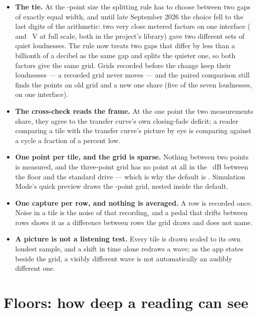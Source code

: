 \documentclass[11pt,a4paper]{article}
\begin{document}
\begin{itemize}
  per rig state, and the picture keeps the pedal's own shift precisely
  because it is not lined up.
  \item \textbf{The tie.} At the \wmTieDimension{}-point size the
  splitting rule has to choose between two gaps of exactly equal width,
  and until late September 2026 the choice fell to the last digits of the
  arithmetic: two very close metered factors on one interface
  (\wmTieFactorA{} and \wmTieFactorB{}~V at full scale, both in the
  project's library) gave two different sets of quiet loudnesses. The
  rule now treats two gaps that differ by less than a billionth of a
  decibel as the same gap and splits the quieter one, so both factors
  give the same grid. Grids recorded before the change keep their
  loudnesses --- a recorded grid never moves --- and the paired
  comparison still finds the points an old grid and a new one share
  (five of the seven loudnesses, on one interface).
  \item \textbf{The cross-check reads the frame.} At the one point the
  two measurements share, they agree to the transfer curve's own
  closing-fade deficit; a reader comparing a tile with the transfer
  curve's picture by eye is comparing against a cycle a fraction of a
  percent low.
  \item \textbf{One point per tile, and the grid is sparse.} Nothing
  between two points is measured, and the three-point grid has no point
  at all in the \wmFloorSpanDB{}~dB between the floor and the standard
  drive --- which is why the default is \wmDefaultDimension{}. Simulation
  Mode's quick preview draws the \wmSimInteractiveDimension{}-point grid,
  nested inside the default.
  \item \textbf{One capture per row, and nothing is averaged.} A row is
  recorded once. Noise in a tile is the noise of that recording, and a
  pedal that drifts between rows shows it as a difference between rows the
  grid draws and does not name.
  \item \textbf{A picture is not a listening test.} Every tile is drawn
  scaled to its own loudest sample, and a shift in time alone redraws a
  wave; as the app states beside the grid, a visibly different wave is not automatically an audibly different one.
\end{itemize}

\clearpage

\section{Floors: how deep a reading can see}
\label{sec:floors-plain}
\end{document}
